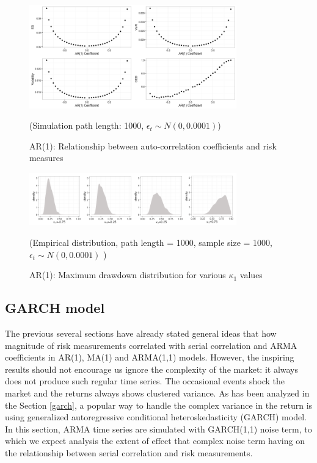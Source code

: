 \documentclass[11pt]{article}
\begin{document}
\begin{figure}[H]
\centering
\includegraphics[width = 0.8\textwidth]{../figures/simulation/AR1_risk_measures}
\caption{AR(1): Relationship between auto-correlation coefficients and risk measures}
(Simulation path length: 1000, $\epsilon_t \sim N(0, 0.0001)$)
\label{fig:AR1_risk_measures}
\end{figure}

\begin{figure}[H]
\centering
\includegraphics[width = 0.8\textwidth]{../figures/simulation/AR1_maxDrawdown_dist_re}
\caption{AR(1): Maximum drawdown distribution for various $\kappa_1$ values }
(Empirical distribution, path length = 1000, sample size = 1000, $\epsilon_t \sim N(0, 0.0001)$ )
\label{fig:AR1_maxDrawdown_dist}
\end{figure}

\subsection{GARCH model}
The previous several sections have already stated general ideas that how magnitude of risk measurements correlated with serial correlation and ARMA coefficients in AR(1), MA(1) and ARMA(1,1) models. However, the inspiring results should not encourage us ignore the complexity of the market: it always does not produce such regular time series. The occasional events shock the market and the returns always shows clustered variance. As has been analyzed in the Section \ref{garch}, a popular way to handle the complex variance in the return is using generalized autoregressive conditional heteroskedasticity (GARCH) model. In this section, ARMA time series are simulated with GARCH(1,1) noise term, to which we expect analysis the extent of effect that complex noise term having on the relationship between serial correlation and risk measurements.
\end{document}
